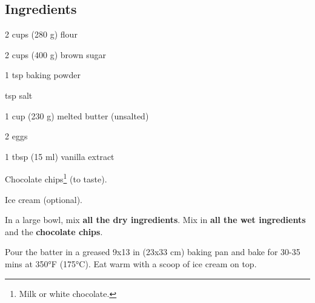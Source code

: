 \newpage
{}

\subsection*{Ingredients}
\begin{ingredients}
	\item 2  cups (280 g) flour
	\item 2 cups (400 g) brown sugar
	\item 1 tsp baking powder
	\item {} tsp salt
	\item 1 cup (230 g) melted butter (unsalted)
	\item 2 eggs
	\item 1 tbsp (15 ml) vanilla extract
	\item Chocolate chips\footnote{Milk or white chocolate.} (to taste).
	\item Ice cream (optional).
\end{ingredients}

\medskip

In a large bowl, mix \textbf{all the dry ingredients}.
Mix in \textbf{all the wet ingredients} and the \textbf{chocolate chips}. 

Pour the batter in a greased 9x13 in (23x33 cm) baking pan and bake for 30-35 mins at 350°F (175°C). 
Eat warm with a scoop of ice cream on top. 

\vspace*{0.75 cm}

\begin{recipeblock}
	\noindent 
\end{recipeblock}